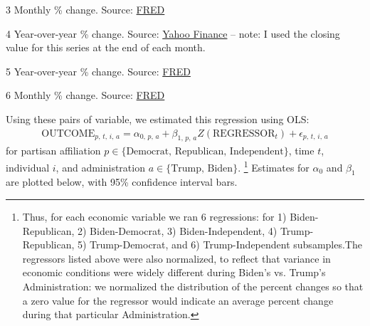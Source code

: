 \documentclass{article}
\begin{document}
\begin{table}[ht!]
\begin{threeparttable}
\begin{tablenotes}
\item[3] Monthly \% change. Source: \href{https://fred.stlouisfed.org/series/CPIAUCSL}{FRED}
\item[4] Year-over-year \% change. Source: \href{https://finance.yahoo.com/quote/\%5EGSPC/}{Yahoo Finance} -- note: I used the closing value for this series at the end of each month.
\item[5] Year-over-year \% change. Source: \href{https://fred.stlouisfed.org/series/A229RX0}{FRED}
\item[6] Monthly \% change. Source: \href{https://fred.stlouisfed.org/series/CUSR0000SETA02}{FRED} 
\end{tablenotes}
\end{threeparttable}
\end{table}

Using these pairs of variable, we estimated this regression using OLS:
\begin{gather}
	 \text{OUTCOME}_{p\text{, }t\text{, }i\text{, }a} = \alpha_{0\text{, }p\text{, }a} + \beta_{1\text{, }p\text{, }a} Z(\text{REGRESSOR}_t) + \epsilon_{p\text{, }t\text{, }i\text{, }a}
\end{gather}
for partisan affiliation $p \in \{\text{Democrat, Republican, Independent}\}$, time $t$, individual $i$, and administration $a \in \{\text{Trump, Biden}\}$. \footnote{Thus, for each economic variable we ran 6 regressions: for 1) Biden-Republican, 2) Biden-Democrat, 3) Biden-Independent, 4) Trump-Republican, 5) Trump-Democrat, and 6) Trump-Independent subsamples.The regressors listed above were also normalized, to reflect that variance in economic conditions were widely different during Biden's vs. Trump's Administration: we normalized the distribution of the percent changes so that a zero value for the regressor would indicate an average percent change during that particular Administration.} Estimates for $\alpha_0$ and $\beta_1$ are plotted below, with 95\% confidence interval bars.
\end{document}
